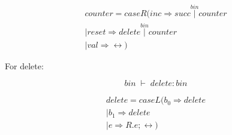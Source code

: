 \documentclass{article}
\begin{document}
\begin{equation}
\begin{split}
counter = caseR( inc \Rightarrow succ \overset{bin}{\vert} counter \\
              | reset \Rightarrow delete \overset{bin}{\vert} counter \\
              | val \Rightarrow \leftrightarrow )
\end{split}
\end{equation}

For delete:

\[
\; bin\; \vdash\; delete:bin\; 
\]

\begin{equation}
\begin{split}
delete = caseL( b_0 \Rightarrow delete \\
              | b_1 \Rightarrow delete \\
              | e \Rightarrow R . e; \leftrightarrow )
\end{split}
\end{equation}






\end{document}
